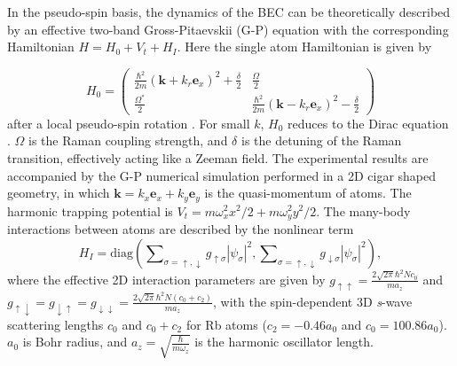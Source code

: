 \documentclass[prl,aps,twocolumn,showpacs,floatfix]{revtex4-1}
\begin{document}
In the pseudo-spin basis, the dynamics of the BEC can be theoretically
described by an effective two-band Gross-Pitaevskii (G-P) equation with the
corresponding Hamiltonian $H=H_{0}+V_{t}+H_{I}$. Here the single atom
Hamiltonian is given by\textbf{\ }

\begin{equation}
H_{0}=%
\begin{pmatrix}
\frac{\hbar ^{2}}{2m}(\mathbf{k}+k_{r}\mathbf{e}_{x})^{2}+{\frac{\delta }{2}}
& {\frac{\Omega }{2}} \\
{\frac{\Omega ^{\ast }}{2}} & \frac{\hbar ^{2}}{2m}(\mathbf{k}-k_{r}\mathbf{e%
}_{x})^{2}-{\frac{\delta }{2}}%
\end{pmatrix}
\label{eq-Heff}
\end{equation}%
after a local pseudo-spin rotation \cite{Lin1}. For small $k$, $H_{0}$
reduces to the Dirac equation \cite{ZBexp}. $\Omega $ is the Raman coupling
strength, and $\delta $ is the detuning of the Raman transition, effectively
acting like a Zeeman field. The experimental results are accompanied by the
G-P numerical simulation performed in a 2D cigar shaped geometry, in which $%
\mathbf{k}=k_{x}\mathbf{e}_{x}+k_{y}\mathbf{e}_{y}$ is the quasi-momentum of
atoms. The harmonic trapping potential is $V_{t}=m\omega
_{x}^{2}x^{2}/2+m\omega _{y}^{2}y^{2}/2${. }The many-body interactions
between atoms are described by the nonlinear term
\begin{equation}
H_{I}=\text{diag}\left( \sum\nolimits_{\sigma =\uparrow ,\downarrow
}g_{\uparrow \sigma }|\psi _{\sigma }|^{2},\sum\nolimits_{\sigma =\uparrow
,\downarrow }g_{\downarrow \sigma }|\psi _{\sigma }|^{2}\right) {,}
\label{2DGP}
\end{equation}%
where the effective 2D interaction parameters are given by $g_{\uparrow
\uparrow }={\frac{2\sqrt{2\pi }\hbar ^{2}Nc_{0}}{ma_{z}}}$ and $g_{\uparrow
\downarrow }=g_{\downarrow \uparrow }=g_{\downarrow \downarrow }={\frac{2%
\sqrt{2\pi }\hbar ^{2}N(c_{0}+c_{2})}{ma_{z}}}$, with the spin-dependent 3D
\textit{s}-wave scattering lengths $c_{0}$ and $c_{0}+c_{2}$ for Rb atoms ($%
c_{2}=-0.46a_{0}$ and $c_{0}=100.86a_{0}$). $a_{0}$ is Bohr radius, and $%
a_{z}=\sqrt{\frac{\hbar }{m\omega _{z}}}$ is the harmonic oscillator length.
\end{document}
